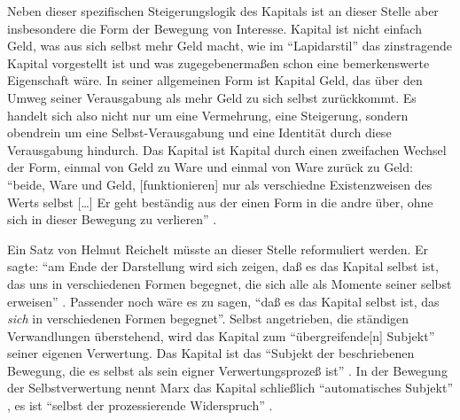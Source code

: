 \documentclass[12pt,
               DIV13,
               paper=a4,
               twoside=false,
               onehalfspacing,
               bibliography=totoc,
               toc=graduated,
               draft,
               ]{scrartcl}
\newcommand{\lips}{\dots\unkern}
\newcommand{\pc}[2]{\parencite[#1]{#2}}
\newcommand{\zn}[3]{\parencite[#1, zit. nach][#2]{#3}}
\begin{document}



Neben dieser spezifischen Steigerungslogik des Kapitals ist an dieser
Stelle aber insbesondere die Form der Bewegung von Interesse. Kapital
ist nicht einfach Geld, was aus sich selbst mehr Geld macht, wie im
"`Lapidarstil"' \pc{170}{kap} das zinstragende Kapital vorgestellt ist
und was zugegebenermaßen schon eine bemerkenswerte Eigenschaft wäre.
In seiner allgemeinen Form ist Kapital Geld, das über den Umweg seiner
Verausgabung als mehr Geld zu sich selbst zurückkommt. Es handelt sich
also nicht nur um eine Vermehrung, eine Steigerung, sondern obendrein
um eine Selbst-Verausgabung und eine Identität durch diese
Verausgabung hindurch. Das Kapital ist Kapital durch einen zweifachen
Wechsel der Form, einmal von Geld zu Ware und einmal von Ware zurück
zu Geld: "`beide, Ware und Geld, [funktionieren] nur als verschiedne
Existenzweisen des Werts selbst [\lips] Er geht beständig aus der
einen Form in die andre über, ohne sich in dieser Bewegung zu
verlieren"' \pc{S. 168 f.}{kap}.


Ein Satz von Helmut Reichelt müsste an dieser Stelle reformuliert
werden. Er sagte: "`am Ende der Darstellung wird sich zeigen, daß es
das Kapital selbst ist, das uns in verschiedenen Formen begegnet, die
sich alle als Momente seiner selbst erweisen"' \pc{181}{reichelt}.
Passender noch wäre es zu sagen, "`daß es das Kapital selbst ist, das
\emph{sich} in verschiedenen Formen begegnet"'. Selbst angetrieben,
die ständigen Verwandlungen überstehend, wird das Kapital zum
"`übergreifende[n] Subjekt"' \pc{169}{kap} seiner eigenen Verwertung.
Das Kapital ist das "`Subjekt der beschriebenen Bewegung, die es
selbst als sein eigner Verwertungsprozeß ist"'
\zn{Marx}{181}{reichelt}. In der Bewegung der Selbstverwertung nennt
Marx das Kapital schließlich "`automatisches Subjekt"' \pc{169}{kap},
es ist "`selbst der prozessierende Widerspruch"' \pc{601}{grundr}.

\end{document}
